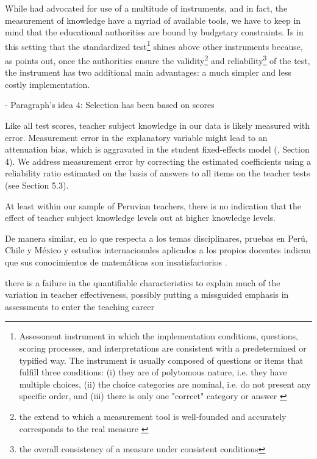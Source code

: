 While \citet{Bertoni_et_al_2020b} had advocated for use of a multitude of instruments, and in fact, the measurement of knowledge have a myriad of available tools, we have to keep in mind that the educational authorities are bound by budgetary constraints. Is in this setting that the standardized test\footnote{Assessment instrument in which the implementation conditions, questions, scoring processes, and interpretations are consistent with a predetermined or typified way. The instrument is usually composed of questions or items that fulfill three conditions: (i) they are of polytomous nature, i.e. they have multiple choices, (ii) the choice categories are nominal, i.e. do not present any specific order, and (iii) there is only one "correct" category or answer \citep{Rivera_2019}} shines above other instruments because, as \citet{Hincapie_et_al_2020} points out, once the authorities ensure the validity\footnote{the extend to which a measurement tool is well-founded and accurately corresponds to the real measure \citep{Kelley_1927}} and reliability\footnote{the overall consistency of a measure under consistent conditions} of the test, the instrument has two additional main advantages: a much simpler and less costly implementation.



- Paragraph's idea 4: Selection has been based on scores


Like all test scores, teacher subject knowledge in our data is likely measured with error. Measurement error in the explanatory variable might lead to an attenuation bias, which is aggravated in the student fixed-effects model (\citep{Angrist_et_al_1999}, Section 4). We address measurement error by correcting the estimated coefficients using a reliability ratio estimated on the basis of answers to all items on the teacher tests (see Section 5.3).

At least within our sample of Peruvian teachers, there is no indication that the effect of teacher subject knowledge levels out at higher knowledge levels. \citep{Metzler_et_al_2012}

De manera similar, en lo que respecta a los temas disciplinares, pruebas en Perú, Chile y México y estudios internacionales aplicados a los propios docentes indican que sus conocimientos de matemáticas son insatisfactorios \citep{Elacqua_et_al_2018}.


\citet{Hanushek_et_al_2012} there is a failure in the quantifiable characteristics to explain much of the variation in teacher effectiveness, possibly putting a missguided emphasis in assessments to enter the teaching career


